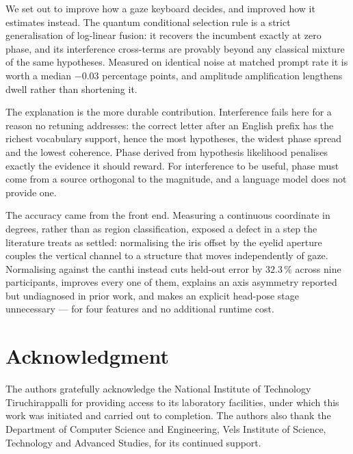 \documentclass[conference]{IEEEtran}
\begin{document}
We set out to improve how a gaze keyboard decides, and improved how it estimates
instead. The quantum conditional selection rule is a strict generalisation of
log-linear fusion: it recovers the incumbent exactly at zero phase, and its
interference cross-terms are provably beyond any classical mixture of the same
hypotheses. Measured on identical noise at matched prompt rate it is worth a
median $-0.03$ percentage points, and amplitude amplification lengthens dwell
rather than shortening it.

The explanation is the more durable contribution. Interference fails here for a
reason no retuning addresses: the correct letter after an English prefix has the
richest vocabulary support, hence the most hypotheses, the widest phase spread
and the lowest coherence. Phase derived from hypothesis likelihood penalises
exactly the evidence it should reward. For interference to be useful, phase must
come from a source orthogonal to the magnitude, and a language model does not
provide one.

The accuracy came from the front end. Measuring a continuous coordinate in
degrees, rather than as region classification, exposed a defect in a step the
literature treats as settled: normalising the iris offset by the eyelid aperture
couples the vertical channel to a structure that moves independently of gaze.
Normalising against the canthi instead cuts held-out error by $32.3\,\%$ across
nine participants, improves every one of them, explains an axis asymmetry
reported but undiagnosed in prior work, and makes an explicit head-pose stage
unnecessary --- for four features and no additional runtime cost.

\section*{Acknowledgment}

The authors gratefully acknowledge the National Institute of Technology
Tiruchirappalli for providing access to its laboratory facilities, under which
this work was initiated and carried out to completion. The authors also thank
the Department of Computer Science and Engineering, Vels Institute of Science,
Technology and Advanced Studies, for its continued support.

\end{document}
